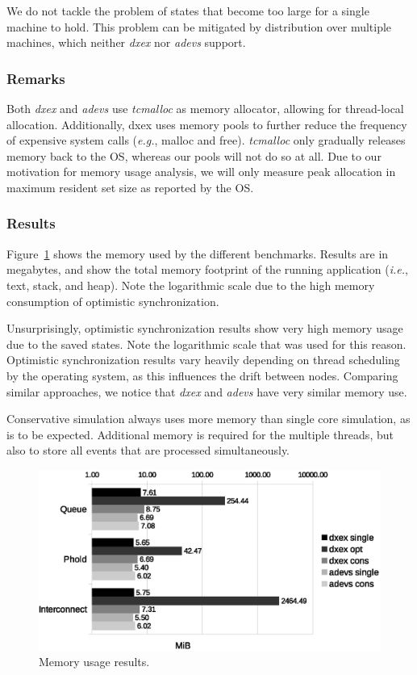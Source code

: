 We do not tackle the problem of states that become too large for a single machine to hold.
This problem can be mitigated by distribution over multiple machines, which neither \textit{dxex} nor \textit{adevs} support.

\subsubsection{Remarks}
Both \textit{dxex} and \textit{adevs} use \textit{tcmalloc} as memory allocator, allowing for thread-local allocation.
Additionally, dxex uses memory pools to further reduce the frequency of expensive system calls (\textit{e.g.}, malloc and free).
\textit{tcmalloc} only gradually releases memory back to the OS, whereas our pools will not do so at all.
Due to our motivation for memory usage analysis, we will only measure peak allocation in maximum resident set size as reported by the OS.

\subsubsection{Results}
Figure~\ref{fig:memory} shows the memory used by the different benchmarks.
Results are in megabytes, and show the total memory footprint of the running application (\textit{i.e.}, text, stack, and heap).
Note the logarithmic scale due to the high memory consumption of optimistic synchronization.

Unsurprisingly, optimistic synchronization results show very high memory usage due to the saved states.
Note the logarithmic scale that was used for this reason.
Optimistic synchronization results vary heavily depending on thread scheduling by the operating system, as this influences the drift between nodes. 
Comparing similar approaches, we notice that \textit{dxex} and \textit{adevs} have very similar memory use.

Conservative simulation always uses more memory than single core simulation, as is to be expected.
Additional memory is required for the multiple threads, but also to store all events that are processed simultaneously.

\begin{figure}
    \includegraphics[width=\columnwidth]{fig/memory_voorlopig.eps}
    \caption{Memory usage results.}
    \label{fig:memory}
\end{figure}

